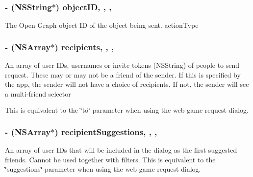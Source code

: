 \subsubsection[{object\+I\+D}]{\setlength{\rightskip}{0pt plus 5cm}-\/ (N\+S\+String$\ast$) object\+I\+D\hspace{0.3cm}{\ttfamily [read]}, {\ttfamily [write]}, {\ttfamily [nonatomic]}, {\ttfamily [copy]}}\label{interface_f_b_s_d_k_game_request_content_a3ea25b3469e4471f3cde2d36fba75127}
The Open Graph object I\+D of the object being sent.  action\+Type \hypertarget{interface_f_b_s_d_k_game_request_content_a6ffc865399f879ec60e5162e1a6d4fa6}{}
\subsubsection[{recipients}]{\setlength{\rightskip}{0pt plus 5cm}-\/ (N\+S\+Array$\ast$) recipients\hspace{0.3cm}{\ttfamily [read]}, {\ttfamily [write]}, {\ttfamily [nonatomic]}, {\ttfamily [copy]}}\label{interface_f_b_s_d_k_game_request_content_a6ffc865399f879ec60e5162e1a6d4fa6}
An array of user I\+Ds, usernames or invite tokens (N\+S\+String) of people to send request.  These may or may not be a friend of the sender. If this is specified by the app, the sender will not have a choice of recipients. If not, the sender will see a multi-\/friend selector

This is equivalent to the \char`\"{}to\char`\"{} parameter when using the web game request dialog. \hypertarget{interface_f_b_s_d_k_game_request_content_aef74918f18e3c07ef21b64b40ed5284e}{}
\subsubsection[{recipient\+Suggestions}]{\setlength{\rightskip}{0pt plus 5cm}-\/ (N\+S\+Array$\ast$) recipient\+Suggestions\hspace{0.3cm}{\ttfamily [read]}, {\ttfamily [write]}, {\ttfamily [nonatomic]}, {\ttfamily [copy]}}\label{interface_f_b_s_d_k_game_request_content_aef74918f18e3c07ef21b64b40ed5284e}
An array of user I\+Ds that will be included in the dialog as the first suggested friends. Cannot be used together with filters.  This is equivalent to the \char`\"{}suggestions\char`\"{} parameter when using the web game request dialog. \hypertarget{interface_f_b_s_d_k_game_request_content_ae626589f2d4e7d36444d34a819989cef}{}
